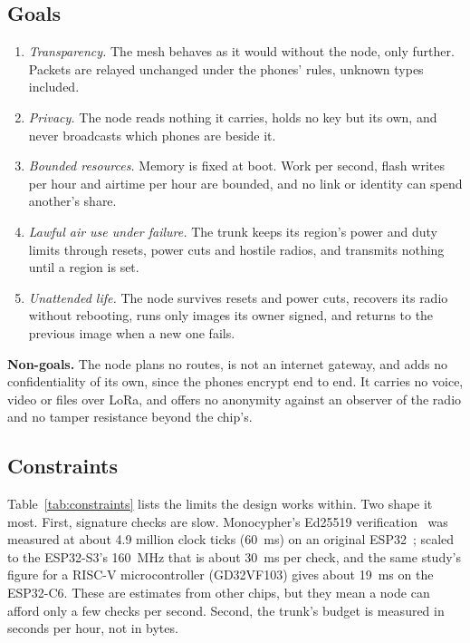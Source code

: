 \documentclass[conference]{IEEEtran}
\begin{document}
\subsection{Goals}
{\renewcommand{\labelenumi}{G\arabic{enumi}.}
\begin{enumerate}
\item \emph{Transparency.} The mesh behaves as it would without the node, only further. Packets are relayed unchanged under the phones' rules, unknown types included.
\item \emph{Privacy.} The node reads nothing it carries, holds no key but its own, and never broadcasts which phones are beside it.
\item \emph{Bounded resources.} Memory is fixed at boot. Work per second, flash writes per hour and airtime per hour are bounded, and no link or identity can spend another's share.
\item \emph{Lawful air use under failure.} The trunk keeps its region's power and duty limits through resets, power cuts and hostile radios, and transmits nothing until a region is set.
\item \emph{Unattended life.} The node survives resets and power cuts, recovers its radio without rebooting, runs only images its owner signed, and returns to the previous image when a new one fails.
\end{enumerate}}

\textbf{Non-goals.} The node plans no routes, is not an internet gateway, and adds no confidentiality of its own, since the phones encrypt end to end. It carries no voice, video or files over LoRa, and offers no anonymity against an observer of the radio and no tamper resistance beyond the chip's.

\subsection{Constraints}
Table~\ref{tab:constraints} lists the limits the design works within. Two shape it most. First, signature checks are slow. Monocypher's Ed25519 verification~\cite{monocypher} was measured at about 4.9 million clock ticks (60~ms) on an original ESP32~\cite{banegasarxiv}; scaled to the ESP32-S3's 160~MHz that is about 30~ms per check, and the same study's figure for a RISC-V microcontroller (GD32VF103) gives about 19~ms on the ESP32-C6. These are estimates from other chips, but they mean a node can afford only a few checks per second. Second, the trunk's budget is measured in seconds per hour, not in bytes.
\end{document}
